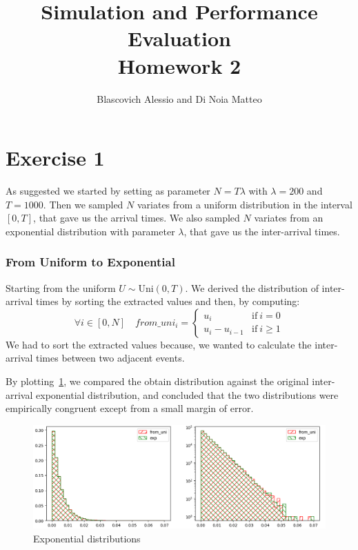 \documentclass[10pt,a4paper]{article}
\title{
  {\Huge Simulation and Performance Evaluation}\\
  \huge Homework 2 \\
}
\author{Blascovich Alessio and Di Noia Matteo}
\begin{document}
\maketitle

\section*{Exercise 1}

As suggested we started by setting as parameter \(N=T\lambda\) with \(\lambda = 200\) and \(T = 1000\). Then we sampled \(N\) variates from a uniform distribution in the interval \([0,T]\), that gave us the arrival times. We also sampled \(N\) variates from an exponential distribution with parameter \(\lambda\), that gave us the inter-arrival times.
\subsubsection*{From Uniform to Exponential}
Starting from the uniform \(U\sim\text{Uni}(0, T)\). We derived the distribution of inter-arrival times by sorting the extracted values and then, by computing:
\begin{equation*}
  \forall i\in[0,N]\quad from\_uni_{i} =
  \begin{cases}
    u_{i} & \text{if}\ i = 0\\
    u_{i} - u_{i-1} & \text{if}\ i\geq 1
  \end{cases}
\end{equation*}
We had to sort the extracted values because, we wanted to calculate the inter-arrival times between two adjacent events.

By plotting~\ref{fig:1}, we compared the obtain distribution against the original inter-arrival exponential distribution, and concluded that the two distributions were empirically congruent except from a small margin of error.

\begin{figure}[h]
  \centering
  \includegraphics[scale=0.4]{es1-1.png}
  \caption{Exponential distributions}
  \label{fig:1}
\end{figure}
\end{document}
